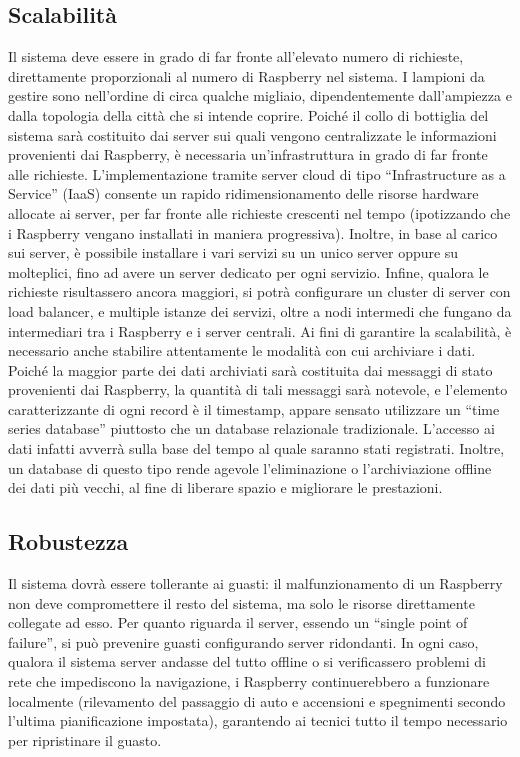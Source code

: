 \subsection{Scalabilità}
Il sistema deve essere in grado di far fronte all'elevato numero di richieste, direttamente proporzionali al numero di Raspberry nel sistema. I lampioni da gestire sono nell'ordine di circa qualche migliaio, dipendentemente dall'ampiezza e dalla topologia della città che si intende coprire. Poiché il collo di bottiglia del sistema sarà costituito dai server sui quali vengono centralizzate le informazioni provenienti dai Raspberry, è necessaria un'infrastruttura in grado di far fronte alle richieste.
L'implementazione tramite server cloud di tipo ``Infrastructure as a Service'' (IaaS) consente un rapido ridimensionamento delle risorse hardware allocate ai server, per far fronte alle richieste crescenti nel tempo (ipotizzando che i Raspberry vengano installati in maniera progressiva). Inoltre, in base al carico sui server, è possibile installare i vari servizi su un unico server oppure su molteplici, fino ad avere un server dedicato per ogni servizio. Infine, qualora le richieste risultassero ancora maggiori, si potrà configurare un cluster di server con load balancer, e multiple istanze dei servizi, oltre a nodi intermedi che fungano da intermediari tra i Raspberry e i server centrali.
Ai fini di garantire la scalabilità, è necessario anche stabilire attentamente le modalità con cui archiviare i dati. Poiché la maggior parte dei dati archiviati sarà costituita dai messaggi di stato provenienti dai Raspberry, la quantità di tali messaggi sarà notevole, e l'elemento caratterizzante di ogni record è il timestamp, appare sensato utilizzare un ``time series database'' piuttosto che un database relazionale tradizionale. L'accesso ai dati infatti avverrà sulla base del tempo al quale saranno stati registrati. Inoltre, un database di questo tipo rende agevole l'eliminazione o l'archiviazione offline dei dati più vecchi, al fine di liberare spazio e migliorare le prestazioni.
\subsection{Robustezza}
Il sistema dovrà essere tollerante ai guasti: il malfunzionamento di un Raspberry non deve compromettere il resto del sistema, ma solo le risorse direttamente collegate ad esso. Per quanto riguarda il server, essendo un ``single point of failure'', si può prevenire guasti configurando server ridondanti. In ogni caso, qualora il sistema server andasse del tutto offline o si verificassero problemi di rete che impediscono la navigazione, i Raspberry continuerebbero a funzionare localmente (rilevamento del passaggio di auto e accensioni e spegnimenti secondo l'ultima pianificazione impostata), garantendo ai tecnici tutto il tempo necessario per ripristinare il guasto.
